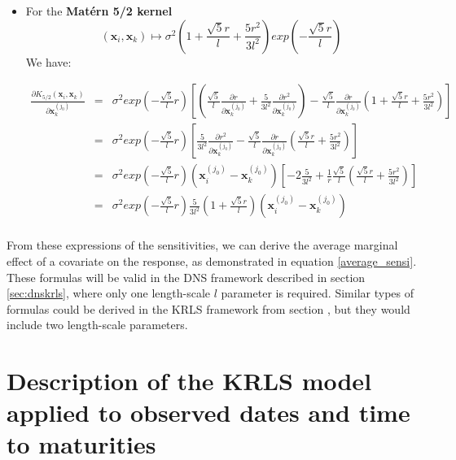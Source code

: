 \begin{itemize}
\item For the \textbf{Mat\'ern 5/2 kernel} 
$$
(\textbf{x}_i, \textbf{x}_k) \mapsto \sigma^2 \left( 1 + \frac{\sqrt{5}r}{l} + \frac{5 r^2}{3 l^2} \right) exp \left( - \frac{\sqrt{5}r}{l} \right)
$$
We have:

\begin{eqnarray*}
\frac{\partial K_{5/2}(\textbf{x}_i, \textbf{x}_k)}{\partial \textbf{x}_k^{(j_0)}} &=& \sigma^2 exp\left(-\frac{\sqrt{5}}{l}r\right) \left[ \left( \frac{\sqrt{5}}{l} \frac{\partial r}{\partial \textbf{x}_k^{(j_0)}} + \frac{5}{3 l^2} \frac{\partial r^2}{\partial \textbf{x}_k^{(j_0)}} \right)  - \frac{\sqrt{5}}{l} \frac{\partial r}{\partial \textbf{x}_k^{(j_0)}}\left( 1 + \frac{\sqrt{5}r}{l} + \frac{5 r^2}{3 l^2} \right)\right] \\
&=& \sigma^2 exp\left(-\frac{\sqrt{5}}{l}r\right) \left[ \frac{5}{3 l^2} \frac{\partial r^2}{\partial \textbf{x}_k^{(j_0)}}  - \frac{\sqrt{5}}{l} \frac{\partial r}{\partial \textbf{x}_k^{(j_0)}}\left(\frac{\sqrt{5}r}{l} + \frac{5 r^2}{3 l^2} \right)\right] \\
&=& \sigma^2 exp\left(-\frac{\sqrt{5}}{l}r\right) \left(\textbf{x}_i^{(j_0)} - \textbf{x}_k^{(j_0)} \right) \left[ -2\frac{5}{3 l^2} + \frac{1}{r}\frac{\sqrt{5}}{l} \left(\frac{\sqrt{5}r}{l} + \frac{5 r^2}{3 l^2} \right)\right] \\
&=& \sigma^2 exp\left(-\frac{\sqrt{5}}{l}r\right) \frac{5}{3l^2} \left( 1 + \frac{\sqrt{5} r}{l} \right)\left(\textbf{x}_i^{(j_0)} - \textbf{x}_k^{(j_0)} \right)\\
\end{eqnarray*}

\end{itemize}

From these expressions of the sensitivities, we can derive the average  marginal effect of a covariate on the response, as demonstrated in equation \ref{average_sensi}. These formulas will be valid in the DNS framework described in section \ref{sec:dnskrls}, where only one length-scale $l$ parameter is required. Similar types of formulas could be derived in the KRLS framework from section \label{sec:krls}, but they would include two length-scale parameters. 


\section{Description of the KRLS model applied to observed dates and time to maturities}
\label{sec:krls}

